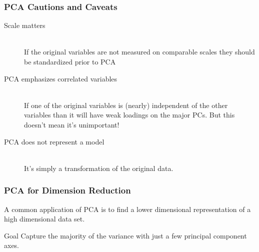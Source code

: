 \documentclass{beamer}
\begin{document}
\begin{frame}
  \frametitle{PCA Cautions and Caveats}

\begin{description}

\item[Scale matters] \mbox{}\\
If the original variables are not measured on comparable scales they should be standardized prior to PCA

\item[PCA emphasizes correlated variables] \mbox{}\\
If one of the original variables is (nearly) independent of the other variables than it will have weak loadings on the major PCs. But this doesn't mean it's unimportant!

\item[PCA does not represent a model] \mbox{}\\
It's simply a transformation of the original data.

\end{description}

\end{frame}

\begin{frame}
  \frametitle{PCA for Dimension Reduction}


A common application of PCA is to find a lower dimensional representation of a high dimensional data set.
\bigskip 

\begin{block}{Goal}
Capture the majority of the variance with just a few principal component axes.
\end{block}

\end{frame}

\end{document}
